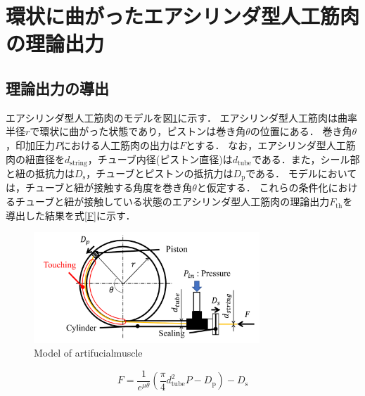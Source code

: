 \section{環状に曲がったエアシリンダ型人工筋肉の理論出力}%
\subsection{理論出力の導出}%
エアシリンダ型人工筋肉のモデルを図\ref{Model of artifucialmuscle}に示す．
エアシリンダ型人工筋肉は曲率半径$r$で環状に曲がった状態であり，ピストンは巻き角$\theta$の位置にある．
巻き角$\theta$，印加圧力$P$における人工筋肉の出力は$F$とする．
なお，エアシリンダ型人工筋肉の紐直径を$d_\mathrm{string}$，チューブ内径(ピストン直径)は$d_\mathrm{tube}$である．また，シール部と紐の抵抗力は$D_\mathrm{s}$，チューブとピストンの抵抗力は$D_\mathrm{p}$である．
モデルにおいては，チューブと紐が接触する角度を巻き角$\theta$と仮定する．
これらの条件化におけるチューブと紐が接触している状態のエアシリンダ型人工筋肉の理論出力$F_\mathrm{th}$を導出した結果を式\eqref{F}に示す．
\begin{figure}[t]
  \centering
  \includegraphics[width=85mm]{_pdf/model_artifucialmuscle.pdf}
  \caption{Model of artifucialmuscle}
  \label{Model of artifucialmuscle}
\end{figure}

\begin{equation}
  \label{F}
  F=\frac{1}{e^{\mu\theta}} (\frac{π}{4}d_\mathrm{tube}^2 P-D_\mathrm{p} )-D_\mathrm{s}
\end{equation}

